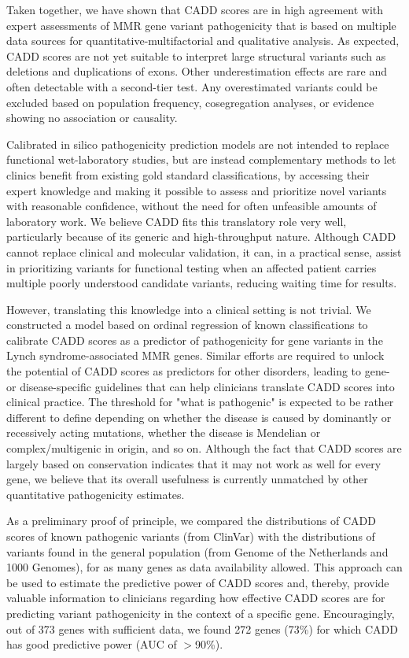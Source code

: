 Taken together, we have shown that CADD scores are in high agreement with expert assessments of MMR gene variant pathogenicity that is based on multiple data sources for quantitative-multifactorial and qualitative analysis.
As expected, CADD scores are not yet suitable to interpret large structural variants such as deletions and duplications of exons.
Other underestimation effects are rare and often detectable with a second-tier test.
Any overestimated variants could be excluded based on population frequency, cosegregation analyses, or evidence showing no association or causality.

Calibrated in silico pathogenicity prediction models are not intended to replace functional wet-laboratory studies, but are instead complementary methods to let clinics benefit from existing gold standard classifications, by accessing their expert knowledge and making it possible to assess and prioritize novel variants with reasonable confidence, without the need for often unfeasible amounts of laboratory work.
We believe CADD fits this translatory role very well, particularly because of its generic and high-throughput nature.
Although CADD cannot replace clinical and molecular validation, it can, in a practical sense, assist in prioritizing variants for functional testing when an affected patient carries multiple poorly understood candidate variants, reducing waiting time for results.

However, translating this knowledge into a clinical setting is not trivial.
We constructed a model based on ordinal regression of known classifications to calibrate CADD scores as a predictor of pathogenicity for gene variants in the Lynch syndrome-associated MMR genes.
Similar efforts are required to unlock the potential of CADD scores as predictors for other disorders, leading to gene- or disease-specific guidelines that can help clinicians translate CADD scores into clinical practice.
The threshold for "what is pathogenic" is expected to be rather different to define depending on whether the disease is caused by dominantly or recessively acting mutations, whether the disease is Mendelian or complex/multigenic in origin, and so on.
Although the fact that CADD scores are largely based on conservation indicates that it may not work as well for every gene, we believe that its overall usefulness is currently unmatched by other quantitative pathogenicity estimates.

As a preliminary proof of principle, we compared the distributions of CADD scores of known pathogenic variants (from ClinVar\cite{Landrum_2013}) with the distributions of variants found in the general population (from Genome of the Netherlands\cite{Boomsma_2014,Francioli_2014} and 1000 Genomes\cite{McVean_2012}), for as many genes as data availability allowed.
This approach can be used to estimate the predictive power of CADD scores and, thereby, provide valuable information to clinicians regarding how effective CADD scores are for predicting variant pathogenicity in the context of a specific gene.
Encouragingly, out of 373 genes with sufficient data, we found 272 genes (73\%) for which CADD has good predictive power (AUC of $>$90\%).

